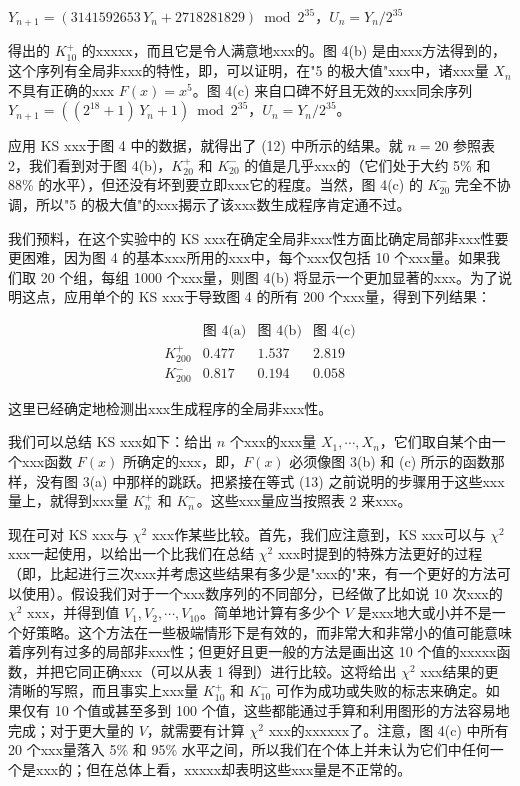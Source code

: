 \noindent $Y_{n+1} = (3141592653\,Y_n + 2718281829) \bmod 2^{35}$，$U_n = Y_n / 2^{35}$

\noindent 得出的 $K_{10}^+$ 的xxxxx，而且它是令人满意地xxx的。图 4(b) 是由xxx方法得到的，这个序列有全局非xxx的特性，即，可以证明，在"5 的极大值"xxx中，诸xxx量 $X_n$ 不具有正确的xxx $F(x) = x^5$。图 4(c) 来自口碑不好且无效的xxx同余序列 $Y_{n+1} = ((2^{18} + 1)\,Y_n + 1) \bmod 2^{35}$，$U_n = Y_n / 2^{35}$。

应用 KS xxx于图 4 中的数据，就得出了 (12) 中所示的结果。就 $n = 20$ 参照表 2，我们看到对于图 4(b)，$K_{20}^+$ 和 $K_{20}^-$ 的值是几乎xxx的（它们处于大约 5\% 和 88\% 的水平），但还没有坏到要立即xxx它的程度。当然，图 4(c) 的 $K_{20}^-$ 完全不协调，所以"5 的极大值"的xxx揭示了该xxx数生成程序肯定通不过。

我们预料，在这个实验中的 KS xxx在确定全局非xxx性方面比确定局部非xxx性要更困难，因为图 4 的基本xxx所用的xxx中，每个xxx仅包括 10 个xxx量。如果我们取 20 个组，每组 1000 个xxx量，则图 4(b) 将显示一个更加显著的xxx。为了说明这点，应用单个的 KS xxx于导致图 4 的所有 200 个xxx量，得到下列结果：

\begin{equation}
\begin{array}{lccc}
 & \text{图 4(a)} & \text{图 4(b)} & \text{图 4(c)} \\
K_{200}^+ & 0.477 & 1.537 & 2.819 \\
K_{200}^- & 0.817 & 0.194 & 0.058
\end{array} \tag{16}
\end{equation}

\noindent 这里已经确定地检测出xxx生成程序的全局非xxx性。

我们可以总结 KS xxx如下：给出 $n$ 个xxx的xxx量 $X_1, \cdots, X_n$，它们取自某个由一个xxx函数 $F(x)$ 所确定的xxx，即，$F(x)$ 必须像图 3(b) 和 (c) 所示的函数那样，没有图 3(a) 中那样的跳跃。把紧接在等式 (13) 之前说明的步骤用于这些xxx量上，就得到xxx量 $K_n^+$ 和 $K_n^-$。这些xxx量应当按照表 2 来xxx。

现在可对 KS xxx与 $\chi^2$ xxx作某些比较。首先，我们应注意到，KS xxx可以与 $\chi^2$ xxx一起使用，以给出一个比我们在总结 $\chi^2$ xxx时提到的特殊方法更好的过程（即，比起进行三次xxx并考虑这些结果有多少是"xxx的"来，有一个更好的方法可以使用）。假设我们对于一个xxx数序列的不同部分，已经做了比如说 10 次xxx的 $\chi^2$ xxx，并得到值 $V_1, V_2, \cdots, V_{10}$。简单地计算有多少个 $V$ 是xxx地大或小并不是一个好策略。这个方法在一些极端情形下是有效的，而非常大和非常小的值可能意味着序列有过多的局部非xxx性；但更好且更一般的方法是画出这 10 个值的xxxxx函数，并把它同正确xxx（可以从表 1 得到）进行比较。这将给出 $\chi^2$ xxx结果的更清晰的写照，而且事实上xxx量 $K_{10}^+$ 和 $K_{10}^-$ 可作为成功或失败的标志来确定。如果仅有 10 个值或甚至多到 100 个值，这些都能通过手算和利用图形的方法容易地完成；对于更大量的 $V$，就需要有计算 $\chi^2$ xxx的xxxxxx了。注意，图 4(c) 中所有 20 个xxx量落入 5\% 和 95\% 水平之间，所以我们在个体上并未认为它们中任何一个是xxx的；但在总体上看，xxxxx却表明这些xxx量是不正常的。

